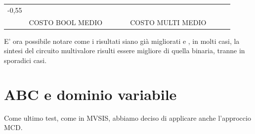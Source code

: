 \documentclass[
]{book}
\begin{document}
\begin{longtable}[]{@{}lllllllll@{}}
\begin{minipage}[t]{0.07\columnwidth}
-0,55\strut
\end{minipage}\tabularnewline
\begin{minipage}[t]{0.07\columnwidth}\raggedright
\strut
\end{minipage} & \begin{minipage}[t]{0.11\columnwidth}\raggedright
COSTO BOOL MEDIO\strut
\end{minipage} & \begin{minipage}[t]{0.08\columnwidth}\raggedright
\strut
\end{minipage} & \begin{minipage}[t]{0.07\columnwidth}\raggedright
\strut
\end{minipage} & \begin{minipage}[t]{0.09\columnwidth}\raggedright
\strut
\end{minipage} & \begin{minipage}[t]{0.12\columnwidth}\raggedright
COSTO MULTI MEDIO\strut
\end{minipage} & \begin{minipage}[t]{0.08\columnwidth}\raggedright
\strut
\end{minipage} & \begin{minipage}[t]{0.07\columnwidth}\raggedright
\strut
\end{minipage} & \begin{minipage}[t]{0.07\columnwidth}\raggedright
\strut
\end{minipage}\tabularnewline
\bottomrule
\end{longtable}

E' ora possibile notare come i risultati siano già migliorati e , in molti casi, la sintesi del circuito multivalore risulti essere migliore di quella binaria, tranne in sporadici casi.

\hypertarget{abc-e-dominio-variabile}{%
\section{ABC e dominio variabile}\label{abc-e-dominio-variabile}}

Come ultimo test, come in MVSIS, abbiamo deciso di applicare anche l'approccio MCD.
\end{document}
